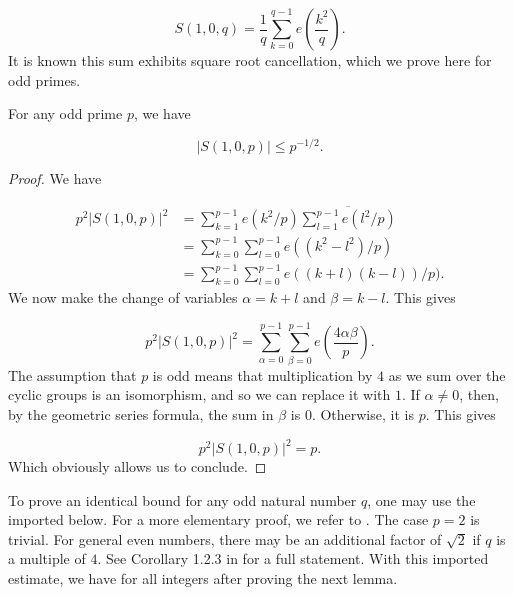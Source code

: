 \documentclass[11pt]{amsart}
\begin{document}
\begin{equation*}
    S(1,0,q) = \frac{1}{q}\sum_{k=0}^{q-1}e(\frac{k^2}{q}).
\end{equation*}
It is known this sum exhibits square root cancellation, which we prove here for odd primes.

\begin{lemma}\label{4: stdGaussSumBndLemma}
For any odd prime $p$, we have

\begin{equation*}\label{4: stdGaussSumBndEqn}
    |S(1,0,p)| \leq p^{-1/2}.
\end{equation*}
    
\end{lemma}

\begin{proof}
We have

\begin{align*}
    p^2|S(1,0,p)|^2 &= \sum_{k=1}^{p-1}e(k^2/p)\overline{\sum_{l=1}^{p-1}e(l^2/p)} \\
    & = \sum_{k=0}^{p-1}\sum_{l=0}^{p-1}e((k^2-l^2)/p)\\
    & = \sum_{k=0}^{p-1}\sum_{l=0}^{p-1}e((k+l)(k-l))/p).
\end{align*}
We now make the change of variables $\alpha = k+l$ and $\beta=k-l$. This gives

\begin{equation*}
    p^2|S(1,0,p)|^2 = \sum_{\alpha=0}^{p-1}\sum_{\beta=0}^{p-1}e(\frac{4\alpha \beta}{p}).
\end{equation*}
The assumption that $p$ is odd means that multiplication by $4$ as we sum over the cyclic groups is an isomorphism, and so we can replace it with $1$. If $\alpha \neq 0$, then, by the geometric series formula, the sum in $\beta$ is $0$. Otherwise, it is $p$. This gives

\begin{equation*}
    p^2|S(1,0,p)|^2 = p.
\end{equation*}
Which obviously allows us to conclude.
\end{proof}
To prove an identical bound for any odd natural number $q$, one may use the imported  below. For a more elementary proof, we refer to \cite{gaussSumMurtySiddhi2017}. The case $p=2$ is trivial.  For general even numbers, there may be an additional factor of $\sqrt{2}$ if $q$ is a multiple of $4$. See Corollary 1.2.3 in \cite{GaussJacobiBook} for a full statement. With this imported estimate, we have  for all integers after proving the next lemma.
\end{document}
